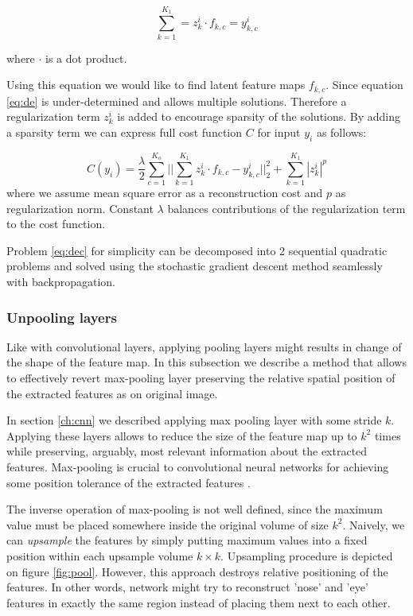 \begin{equation}\label{eq:de}
  \sum^{K_1}_{k=1}=z^i_k \cdot f_{k,c} = y^i_{k,c}
\end{equation}

where $\cdot$ is a dot product.

Using this equation we would like to find latent feature maps $f_{k,c}$.
Since equation \ref{eq:de} is under-determined and allows multiple solutions.
Therefore a regularization term $z^i_k$ is added to encourage sparsity of the solutions.
By adding a sparsity term we can express full cost function $C$ for input $y_i$ as follows:

\begin{equation}\label{eq:dec}
    C(y_i) = \frac{\lambda}{2} \sum^{K_o}_{c=1} ||\sum^{K_1}_{k=1}{z^i_k \cdot f_{k,c} - y^i_{k,c}}||^2_2 + \sum^{K_1}_{k=1}{|z^i_k|^p}
\end{equation}
where we assume mean square error as a reconstruction cost and $p$ as regularization norm.
Constant $\lambda$ balances contributions of the regularization term to the cost function.

Problem \ref{eq:dec} for simplicity can be decomposed into 2 sequential quadratic problems and solved using the stochastic gradient descent method seamlessly with backpropagation.

\subsubsection{Unpooling layers}

Like with convolutional layers, applying pooling layers might results in change of the shape of the feature map.
In this subsection we describe a method that allows to effectively revert max-pooling layer preserving the relative spatial position of the extracted features as on original image.

In section \ref{ch:cnn} we described applying max pooling layer with some stride $k$.
Applying these layers allows to reduce the size of the feature map up to $k^2$ times while preserving, arguably, most relevant information about the extracted features.
Max-pooling is crucial to convolutional neural networks for achieving some position tolerance of the extracted features \cite{Jaderberg2015}.

The inverse operation of max-pooling is not well defined, since the maximum value must be placed somewhere inside the original volume of size $k^2$. Naively, we can \textit{upsample} the features by simply putting maximum values into a fixed position within each upsample volume $k \times k$.
Upsampling procedure is depicted on figure \ref{fig:pool}.
However, this approach destroys relative positioning of the features.
In other words, network might try to reconstruct 'nose' and 'eye' features in exactly the same region instead of placing them next to each other.

